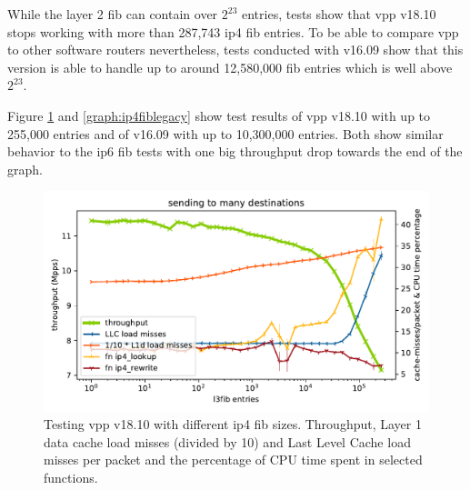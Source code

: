 While the layer 2 \Ac{fib} can contain over $2^{23}$ entries, tests
show that \Ac{vpp} v18.10 stops working with more than 287,743
\Ac{ip4} \Ac{fib} entries. To be able to compare \Ac{vpp} to other
software routers nevertheless, tests conducted with v16.09 show that
this version is able to handle up to around 12,580,000 \Ac{fib}
entries which is well above $2^{23}$.

Figure \ref{graph:ip4fib} and \ref{graph:ip4fiblegacy} show test
results of \Ac{vpp} v18.10 with up to 255,000 entries and of v16.09
with up to 10,300,000 entries. Both show similar behavior to the
\Ac{ip6} \Ac{fib} tests with one big throughput drop towards the end
of the graph.


\begin{figure}[!ht]
\noindent\hspace{0.5mm}\includegraphics[width=\linewidth]{pics/throughput_l3_routes_klaipeda32ghz_v3.pdf}
\caption{Testing \Ac{vpp} v18.10 with different \Ac{ip4} \Ac{fib} sizes. Throughput, Layer 1 data cache load misses (divided by 10) and Last Level Cache load misses per packet and the percentage of CPU time spent in selected functions.}
\label{graph:ip4fib}
\end{figure}

